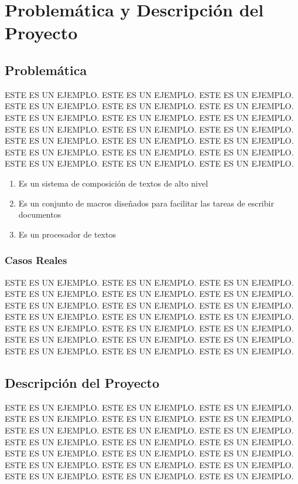 \documentclass[12pt,spanish]{report}
\begin{document}
\chapter{Problem\'atica y Descripci\'on del Proyecto}
\newpage

\section{Problem\'atica}
ESTE ES UN EJEMPLO. ESTE ES UN EJEMPLO. ESTE ES UN EJEMPLO.
ESTE ES UN EJEMPLO. ESTE ES UN EJEMPLO. ESTE ES UN EJEMPLO.
ESTE ES UN EJEMPLO. ESTE ES UN EJEMPLO. ESTE ES UN EJEMPLO.
ESTE ES UN EJEMPLO. ESTE ES UN EJEMPLO. ESTE ES UN EJEMPLO.
ESTE ES UN EJEMPLO. ESTE ES UN EJEMPLO. ESTE ES UN EJEMPLO.
ESTE ES UN EJEMPLO. ESTE ES UN EJEMPLO. ESTE ES UN EJEMPLO.
ESTE ES UN EJEMPLO. ESTE ES UN EJEMPLO. ESTE ES UN EJEMPLO.

\begin{enumerate}
\item Es un sistema de composici\'on de textos de alto nivel
\item Es un conjunto de macros dise\~nados para facilitar las tareas de escribir documentos
\item Es un procesador de textos
\end{enumerate}

\subsection{Casos Reales}
ESTE ES UN EJEMPLO. ESTE ES UN EJEMPLO. ESTE ES UN EJEMPLO.
ESTE ES UN EJEMPLO. ESTE ES UN EJEMPLO. ESTE ES UN EJEMPLO.
ESTE ES UN EJEMPLO. ESTE ES UN EJEMPLO. ESTE ES UN EJEMPLO.
ESTE ES UN EJEMPLO. ESTE ES UN EJEMPLO. ESTE ES UN EJEMPLO.
ESTE ES UN EJEMPLO. ESTE ES UN EJEMPLO. ESTE ES UN EJEMPLO.
ESTE ES UN EJEMPLO. ESTE ES UN EJEMPLO. ESTE ES UN EJEMPLO.
ESTE ES UN EJEMPLO. ESTE ES UN EJEMPLO. ESTE ES UN EJEMPLO.

\section{Descripci\'on del Proyecto}
ESTE ES UN EJEMPLO. ESTE ES UN EJEMPLO. ESTE ES UN EJEMPLO.
ESTE ES UN EJEMPLO. ESTE ES UN EJEMPLO. ESTE ES UN EJEMPLO.
ESTE ES UN EJEMPLO. ESTE ES UN EJEMPLO. ESTE ES UN EJEMPLO.
ESTE ES UN EJEMPLO. ESTE ES UN EJEMPLO. ESTE ES UN EJEMPLO.
ESTE ES UN EJEMPLO. ESTE ES UN EJEMPLO. ESTE ES UN EJEMPLO.
ESTE ES UN EJEMPLO. ESTE ES UN EJEMPLO. ESTE ES UN EJEMPLO.
ESTE ES UN EJEMPLO. ESTE ES UN EJEMPLO. ESTE ES UN EJEMPLO.
\newpage
\end{document}
